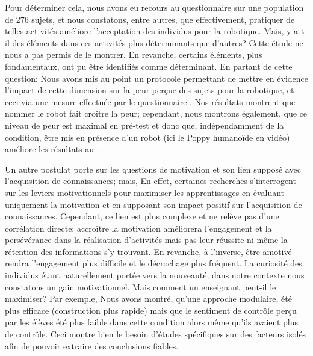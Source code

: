     Pour déterminer cela, nous avons eu recours au questionnaire  sur une population de 276 sujets, et nous constatons, entre autres, que effectivement, pratiquer de telles activités améliore l'acceptation des individus pour la robotique. Mais, y a-t-il des éléments dans ces activités plus déterminants que d'autres? Cette étude ne nous a pas permis de le montrer. En revanche, certains éléments, plus fondamentaux, ont pu être identifiés comme déterminant. En partant de cette question:
    Nous avons mis au point un protocole permettant de mettre en évidence l'impact de cette dimension  sur la peur perçue des sujets pour la robotique, et ceci via une mesure effectuée par le questionnaire . Nos résultats montrent que nommer le robot fait croître la peur; cependant, nous montrons également, que ce niveau de peur est maximal en pré-test et donc que, indépendamment de la condition, être mis en présence d'un robot (ici le Poppy humanoïde en vidéo) améliore les résultats au .\par%
    Un autre postulat porte sur les questions de motivation et son lien supposé avec l'acquisition de connaissances; mais,
    En effet, certaines recherches s'interrogent sur les leviers motivationnels pour maximiser les apprentissages en évaluant uniquement la motivation et en supposant son impact positif sur l'acquisition de connaissances. Cependant, ce lien est plus complexe et ne relève pas d'une corrélation directe: accroître la motivation améliorera l'engagement et la persévérance dans la réalisation d'activités mais pas leur réussite ni même la rétention des informations s'y trouvant. En revanche, à l'inverse, être amotivé rendra l'engagement plus difficile et le décrochage plus fréquent. 
    La curiosité des individus étant naturellement portée vers la nouveauté; dans notre contexte  nous constatons un gain motivationnel. Mais comment un enseignant peut-il le maximiser? Par exemple, 
    Nous avons montré, qu'une approche modulaire, été plus efficace (\ie construction plus rapide) mais que le sentiment de contrôle perçu par les élèves  été plus faible dans cette condition alors même qu'ils avaient  plus de contrôle. Ceci montre bien le besoin d'études spécifiques sur des facteurs isolés afin de pouvoir extraire des conclusions fiables. %
